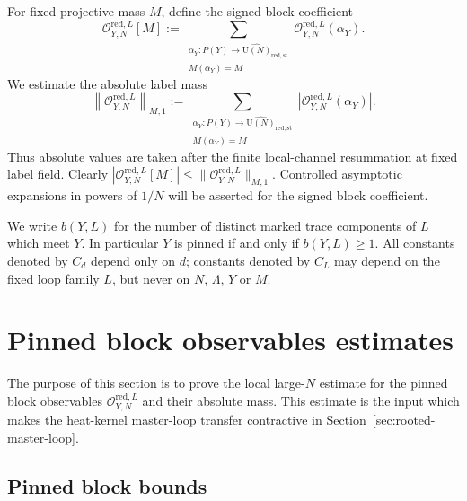 \documentclass[11pt,a4paper,reqno]{amsart}
\theoremstyle{definition}
\theoremstyle{remark}
\newcommand\U{{\mathrm U}}
\begin{document}
For fixed projective mass $M$, define the signed block coefficient
\begin{equation}\label{eq:signed-block-observable}
\mathcal O_{Y,N}^{\mathrm{red},L}[M]
:=
\sum_{\substack{\alpha_Y:P(Y)\to\widehat{\U(N)}_{\mathrm{red},\mathrm{st}}\\ M(\alpha_Y)=M}}
\mathcal O_{Y,N}^{\mathrm{red},L}(\alpha_Y).
\end{equation}
We estimate the absolute label mass
\begin{equation}\label{eq:absolute-block-observable}
\left\|\mathcal O_{Y,N}^{\mathrm{red},L}\right\|_{M,1}
:=
\sum_{\substack{\alpha_Y:P(Y)\to\widehat{\U(N)}_{\mathrm{red},\mathrm{st}}\\ M(\alpha_Y)=M}}
\left|\mathcal O_{Y,N}^{\mathrm{red},L}(\alpha_Y)\right|.
\end{equation}
Thus absolute values are taken after the finite local-channel resummation at fixed label field.  Clearly
$|\mathcal O_{Y,N}^{\mathrm{red},L}[M]|
\le \|\mathcal O_{Y,N}^{\mathrm{red},L}\|_{M,1}$.
Controlled asymptotic expansions in powers of $1/N$ will be asserted for the signed block coefficient.

We write $b(Y,L)$ for the number of distinct marked trace components of $L$ which meet $Y$.  In particular $Y$ is pinned if and only if $b(Y,L)\ge1$.  All constants denoted by $C_d$ depend only on $d$; constants denoted by $C_L$ may depend on the fixed loop family $L$, but never on $N$, $\Lambda$, $Y$ or $M$.

\section{Pinned block observables estimates}
\label{sec:pinned-haar-projection}

The purpose of this section is to prove the local large-$N$ estimate for the pinned block observables $\mathcal O_{Y,N}^{\mathrm{red},L}$ and their absolute mass. This estimate is the input which makes the heat-kernel master-loop transfer contractive in Section~\ref{sec:rooted-master-loop}.

\subsection{Pinned block bounds}
\end{document}
